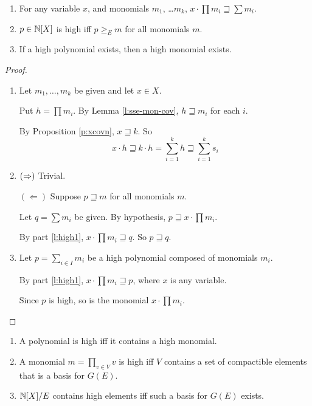 \documentclass[numbers=enddot]{scrartcl}
\newcommand{\gtE}{\geq_E}
\newcommand{\cov}{\sqsupseteq}
\newcommand{\LA}{\Leftarrow}
\begin{document}
\begin{lemma} \label{l:high} \hfill
\begin{enumerate} 
    \item \label{l:high1} 
    For any variable $x$, and monomials $m_1$, \dots $m_k$, $x \cdot \prod m_i \cov \sum m_i$.
    \item \label{l:high2}
    $p \in \mathbb{N}[X]$ is high iff $p \gtE m$ for all monomials $m$.
    \item \label{l:high3}
    If a high polynomial exists, then a high monomial exists.
\end{enumerate}
\end{lemma}
\begin{proof}
\begin{enumerate}
    \item 
    Let $m_1,\dots,m_k$ be given and let $x \in X$.

    Put $h = \prod m_i$. By Lemma \ref{l:sse-mon-cov}, $h \cov m_i$ for each $i$.

    By Proposition \ref{p:xcovn}, $x \cov k$.  So 
    \[ x \cdot h \cov k \cdot h = \sum_{i=1}^k h \cov \sum_{i=1}^k s_i \]
    \item  
      $(\Rightarrow)$ Trivial.

  $(\LA)$ Suppose $p \cov m$ for all monomials $m$.
  
  Let $q = \sum m_i$ be given.  By hypothesis, $p \cov x \cdot \prod m_i$.
  
    By part \ref{l:high1}, $x \cdot \prod m_i \cov q$.  So $p \cov q$.
  
    \item
    Let $p = \sum_{i \in I} m_i$ be a high polynomial composed of monomials $m_i$.
    
    By part \ref{l:high1}, $x \cdot \prod m_i \cov p$, where $x$ is any variable.
    
    Since $p$ is high, so is the monomial $x \cdot \prod m_i$. \qedhere
    \end{enumerate}
\end{proof}

\begin{thm} \label{t:high}
  \begin{enumerate}
    \item \label{t:high1} A polynomial is high iff it contains a high monomial.
    \item \label{t:high2} A monomial $m = \prod_{v \in V} v$ is high iff $V$ contains a set of compactible elements that is a basis for $G(E)$.
    \item \label{t:high3} $\mathbb{N}[X]/E$ contains high elements iff such a basis for $G(E)$ exists.
  \end{enumerate}
\end{thm}
\end{document}
